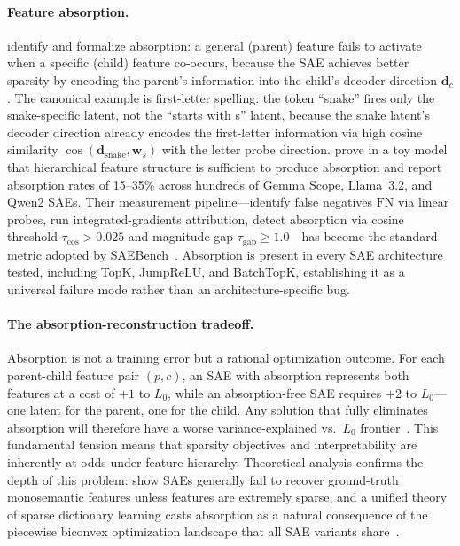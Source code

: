 \documentclass{article}
\begin{document}
\paragraph{Feature absorption.} \citet{chanin2024absorption} identify and formalize absorption: a general (parent) feature fails to activate when a specific (child) feature co-occurs, because the SAE achieves better sparsity by encoding the parent's information into the child's decoder direction $\mathbf{d}_c$. The canonical example is first-letter spelling: the token ``snake'' fires only the snake-specific latent, not the ``starts with s'' latent, because the snake latent's decoder direction already encodes the first-letter information via high cosine similarity $\cos(\mathbf{d}_{\text{snake}}, \mathbf{w}_s)$ with the letter probe direction. \citet{chanin2024absorption} prove in a toy model that hierarchical feature structure is sufficient to produce absorption and report absorption rates of 15--35\% across hundreds of Gemma Scope, Llama~3.2, and Qwen2 SAEs. Their measurement pipeline---identify false negatives $\text{FN}$ via linear probes, run integrated-gradients attribution, detect absorption via cosine threshold $\tau_{\cos} > 0.025$ and magnitude gap $\tau_{\text{gap}} \geq 1.0$---has become the standard metric adopted by SAEBench~\citep{karvonen2025saebench}. Absorption is present in every SAE architecture tested, including TopK, JumpReLU, and BatchTopK, establishing it as a universal failure mode rather than an architecture-specific bug.

\paragraph{The absorption-reconstruction tradeoff.} Absorption is not a training error but a rational optimization outcome. For each parent-child feature pair $(p, c)$, an SAE with absorption represents both features at a cost of $+1$ to $L_0$, while an absorption-free SAE requires $+2$ to $L_0$---one latent for the parent, one for the child. Any solution that fully eliminates absorption will therefore have a worse variance-explained vs.\ $L_0$ frontier~\citep{chanin2024absorption}. This fundamental tension means that sparsity objectives and interpretability are inherently at odds under feature hierarchy. Theoretical analysis confirms the depth of this problem: \citet{cui2025limits} show SAEs generally fail to recover ground-truth monosemantic features unless features are extremely sparse, and a unified theory of sparse dictionary learning casts absorption as a natural consequence of the piecewise biconvex optimization landscape that all SAE variants share~\citep{tang2025unified}.
\end{document}
